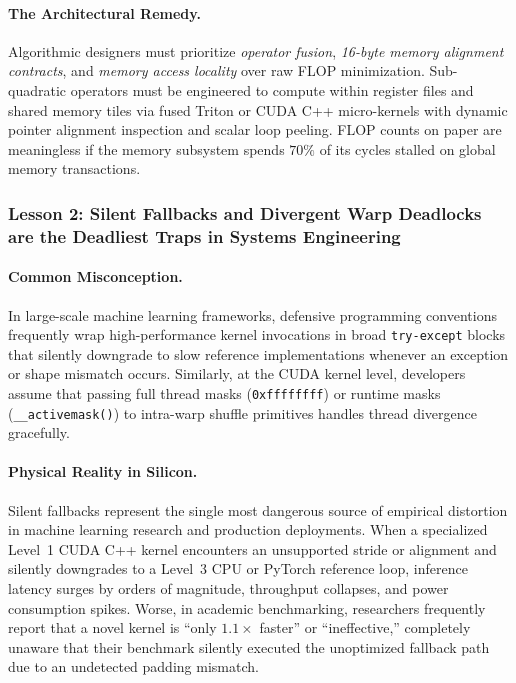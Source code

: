 \paragraph{The Architectural Remedy.}
Algorithmic designers must prioritize \emph{operator fusion}, \emph{16-byte memory alignment contracts}, and \emph{memory access locality} over raw FLOP minimization.
Sub-quadratic operators must be engineered to compute within register files and shared memory tiles via fused Triton or CUDA C++ micro-kernels with dynamic pointer alignment inspection and scalar loop peeling.
FLOP counts on paper are meaningless if the memory subsystem spends $70\%$ of its cycles stalled on global memory transactions.

\subsubsection{Lesson 2: Silent Fallbacks and Divergent Warp Deadlocks are the Deadliest Traps in Systems Engineering}
\label{subsubsec:lesson2}

\paragraph{Common Misconception.}
In large-scale machine learning frameworks, defensive programming conventions frequently wrap high-performance kernel invocations in broad \texttt{try-except} blocks that silently downgrade to slow reference implementations whenever an exception or shape mismatch occurs.
Similarly, at the CUDA kernel level, developers assume that passing full thread masks (\texttt{0xffffffff}) or runtime masks (\texttt{\_\_activemask()}) to intra-warp shuffle primitives handles thread divergence gracefully.

\paragraph{Physical Reality in Silicon.}
Silent fallbacks represent the single most dangerous source of empirical distortion in machine learning research and production deployments.
When a specialized Level~1 CUDA C++ kernel encounters an unsupported stride or alignment and silently downgrades to a Level~3 CPU or PyTorch reference loop, inference latency surges by orders of magnitude, throughput collapses, and power consumption spikes.
Worse, in academic benchmarking, researchers frequently report that a novel kernel is ``only $1.1\times$ faster'' or ``ineffective,'' completely unaware that their benchmark silently executed the unoptimized fallback path due to an undetected padding mismatch.

